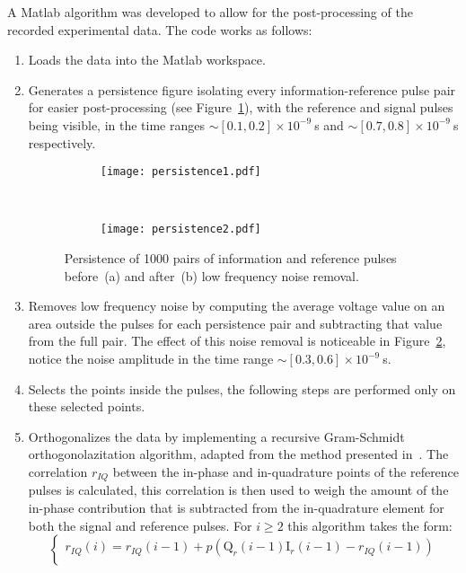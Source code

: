A Matlab algorithm was developed to allow for the post-processing of the recorded experimental data. The code works as follows:
\begin{enumerate}
\item Loads the data into the Matlab workspace.
\item Generates a persistence figure isolating every information-reference pulse pair for easier post-processing (see Figure~\ref{fig:persistence1}), with the reference and signal pulses being visible, in the time ranges $\sim[0.1,0.2]\times10^{-9}~$s and $\sim[0.7,0.8]\times10^{-9}~$s respectively.
\begin{figure}[h]
\centering
\begin{subfigure}{.45\linewidth}
\texttt{[image: persistence1.pdf]}
\caption{}
\label{fig:persistence1}
\end{subfigure}
~
\begin{subfigure}{.45\linewidth}
\texttt{[image: persistence2.pdf]}
\caption{}
\label{fig:persistence2}
\end{subfigure}
\caption{Persistence of 1000 pairs of information and reference pulses before~(a) and after~(b) low frequency noise removal.}
\label{fig:persistence}
\end{figure}
\item Removes low frequency noise by computing the average voltage value on an area outside the pulses for each persistence pair and subtracting that value from the full pair. The effect of this noise removal is noticeable in Figure~\ref{fig:persistence2}, notice the noise amplitude in the time range $\sim[0.3,0.6]\times10^{-9}~$s.
\item Selects the points inside the pulses, the following steps are performed only on these selected points.
\item Orthogonalizes the data by implementing a recursive Gram-Schmidt orthogonolazitation algorithm, adapted from the method presented in~\cite{huang2001recursive}. The correlation $r_{IQ}$ between the in-phase and in-quadrature points of the reference pulses is calculated, this correlation is then used to weigh the amount of the in-phase contribution that is subtracted from the in-quadrature element for both the signal and reference pulses. For $i\geq2$ this algorithm takes the form:
\begin{equation}
\begin{cases}
r_{IQ}(i)=r_{IQ}(i-1)+p\left(\text{Q}_r(i-1)\text{I}_r(i-1)-r_{IQ}(i-1)\right)\\

\end{cases}
\end{equation}
\end{enumerate}
